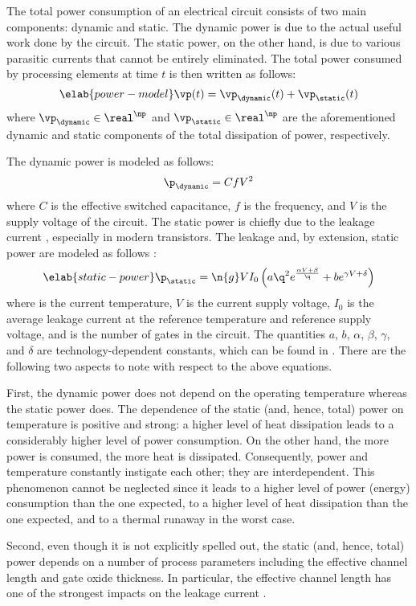 The total power consumption of an electrical circuit consists of two main
components: dynamic and static. The dynamic power is due to the actual useful
work done by the circuit. The static power, on the other hand, is due to various
parasitic currents that cannot be entirely eliminated. The total power consumed
by \np processing elements at time $t$ is then written as follows:
\begin{equation} \elab{power-model}
  \vp(t) = \vp_\dynamic(t) + \vp_\static(t)
\end{equation}
where $\vp_\dynamic \in \real^\np$ and $\vp_\static \in \real^\np$ are the
aforementioned dynamic and static components of the total dissipation of power,
respectively.

The dynamic power is modeled as follows:
\[
  \p_\dynamic = C f V^2
\]
where $C$ is the effective switched capacitance, $f$ is the frequency, and $V$
is the supply voltage of the circuit. The static power is chiefly due to the
leakage current \cite{chandrakasan2000, srivastava2010, juan2011, juan2012},
especially in modern  transistors. The leakage and, by extension,
static power are modeled as follows \cite{liao2005}:
\begin{equation} \elab{static-power}
  \p_\static = \n{g} V I_0 \left(a \q^2 e^{\frac{\alpha V + \beta}{\q}} + b e^{\gamma V + \delta}\right)
\end{equation}
where \q is the current temperature, $V$ is the current supply voltage, $I_0$ is
the average leakage current at the reference temperature and reference supply
voltage, and  is the number of gates in the circuit. The quantities $a$,
$b$, $\alpha$, $\beta$, $\gamma$, and $\delta$ are technology-dependent
constants, which can be found in \cite{liao2005}. There are the following two
aspects to note with respect to the above equations.

First, the dynamic power does not depend on the operating temperature whereas
the static power does. The dependence of the static (and, hence, total) power on
temperature is positive and strong: a higher level of heat dissipation leads to
a considerably higher level of power consumption. On the other hand, the more
power is consumed, the more heat is dissipated. Consequently, power and
temperature constantly instigate each other; they are interdependent. This
phenomenon cannot be neglected since it leads to a higher level of power
(energy) consumption than the one expected, to a higher level of heat
dissipation than the one expected, and to a thermal runaway in the worst case.

Second, even though it is not explicitly spelled out, the static (and, hence,
total) power depends on a number of process parameters including the effective
channel length and gate oxide thickness. In particular, the effective channel
length has one of the strongest impacts on the leakage current \cite{juan2012}.
